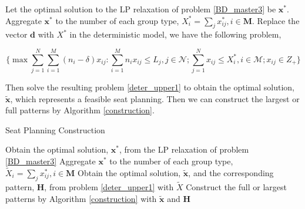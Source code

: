 
Let the optimal solution to the LP relaxation of problem \eqref{BD_master3} be $\mathbf{x}^{*}$. Aggregate $\mathbf{x}^{*}$ to the number of each group type, ${X}^{*}_{i} =\sum_{j} x^{*}_{ij}, i \in \mathbf{M}$. Replace the vector $\mathbf{d}$ with ${X}^{*}$ in the deterministic model, we have the following problem, 

\begin{equation}\label{deter_upper1}
  \{\max \sum_{j=1}^{N} \sum_{i=1}^{M}(n_i -\delta) x_{ij}: \sum_{i = 1}^{M} n_i x_{ij} \leq L_{j}, j \in \mathcal{N}; \sum_{j =1}^{N} x_{ij} \leq {X}^{*}_{i}, i \in \mathcal{M}; x_{ij} \in Z_{+} \}
\end{equation}

Then solve the resulting problem \eqref{deter_upper1} to obtain the optimal solution, $\mathbf{\tilde{x}}$, which represents a feasible seat planning. Then we can construct the largest or full patterns by Algorithm \ref{construction}.



\begin{algorithm}
  \caption{Seat Planning Construction}\label{seat_construction}
    {Obtain the optimal solution, $\mathbf{x}^{*}$, from the LP relaxation of problem \eqref{BD_master3}\;}
    {Aggregate $\mathbf{x}^{*}$ to the number of each group type, $\tilde{X}_{i} = \sum_{j} x^{*}_{ij}, i \in \mathbf{M}$\;}
    {Obtain the optimal solution, $\tilde{\mathbf{x}}$, and the corresponding pattern, $\bm{H}$, from problem \eqref{deter_upper1} with $\tilde{X}$\;}
    {Construct the full or largest patterns by Algorithm \ref{construction} with $\tilde{\mathbf{x}}$ and $\bm{H}$\;}
\end{algorithm}


